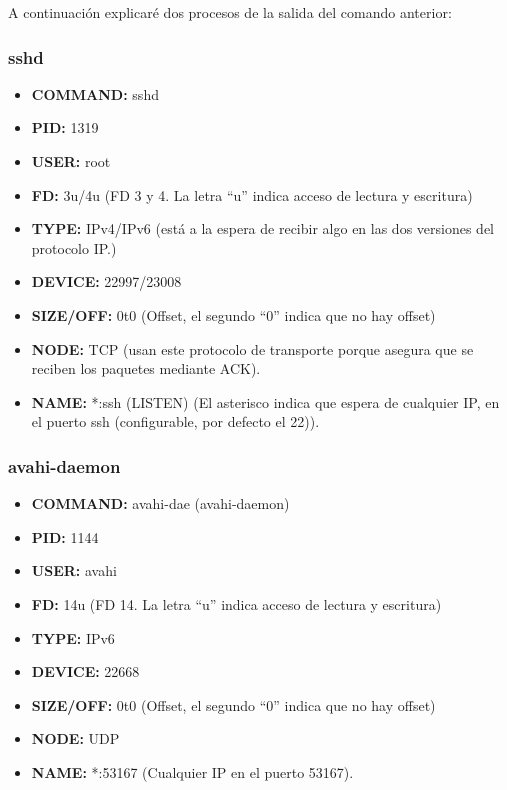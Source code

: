 \documentclass{article}
\begin{document}
\bigskip

A continuación explicaré dos procesos de la salida del comando anterior:

\subsubsection*{sshd}
\begin{itemize}
    \item \textbf{COMMAND: }sshd
    \item \textbf{PID: }1319
    \item \textbf{USER: }root
    \item \textbf{FD: }3u/4u (FD 3 y 4. La letra ``u'' indica acceso de lectura y escritura)
    \item \textbf{TYPE: }IPv4/IPv6 (está a la espera de recibir algo en las dos versiones del protocolo IP.)
    \item \textbf{DEVICE: }22997/23008
    \item \textbf{SIZE/OFF: }0t0 (Offset, el segundo ``0'' indica que no hay offset)
    \item \textbf{NODE: }TCP (usan este protocolo de transporte porque asegura que se reciben los paquetes mediante ACK).
    \item \textbf{NAME: }*:ssh (LISTEN) (El asterisco indica que espera de cualquier IP, en el puerto ssh (configurable, por defecto el 22)).
\end{itemize}

\subsubsection*{avahi-daemon}
\begin{itemize}
    \item \textbf{COMMAND: }avahi-dae (avahi-daemon)
    \item \textbf{PID: }1144
    \item \textbf{USER: }avahi
    \item \textbf{FD: }14u (FD 14. La letra ``u'' indica acceso de lectura y escritura)
    \item \textbf{TYPE: }IPv6
    \item \textbf{DEVICE: }22668
    \item \textbf{SIZE/OFF: }0t0 (Offset, el segundo ``0'' indica que no hay offset)
    \item \textbf{NODE: }UDP
    \item \textbf{NAME: }*:53167 (Cualquier IP en el puerto 53167).
\end{itemize}
\end{document}
